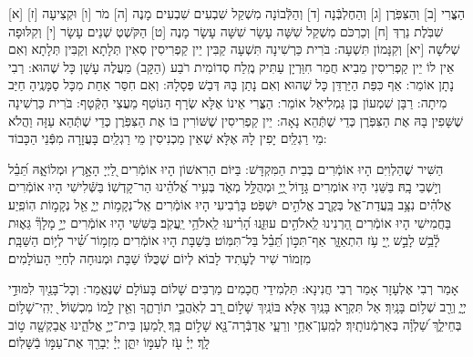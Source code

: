 \documentclass[twoside, openany, parskip=half, 11pt]{book}
\begin{document}
 [א] הַצֳּרִי [ב] וְהַצִּפֹּֽרֶן [ג] וְהַחֶלְבְּֿנָה [ד] וְהַלְּֿבוֹנָה מִשְׁקַל שִׁבְעִים שִׁבְעִים מָנֶה [ה] מֹר [ו] וּקְצִיעָה [ז] שִׁבֹּֽלֶת נֵרְדְּ [ח] וְכַרְכֹּם מִשְׁקַל שִׁשָּׁה עָשָׂר שִׁשָּׁה עָשָׂר מָנֶה [ט] הַקֹּשְׁטְ שְׁנֵים עָשָׂר [י] וְקִלּוּפָה שְׁלֹשָׁה [יא] וְקִנָּמוֹן תִּשְׁעָה: בֹּרִית כַּרְשִׁינָה תִּשְׁעָה קַבִּין יֵין קַפְרִיסִין סְאִין תְּלָתָא וְקַבִּין תְּלָתָא וְאִם אֵין לוֹ יֵין קַפְרִיסִין מֵבִיא חֲמַר חִוַּרְיָן עַתִּיק מֶֽלַח סְדוֹמִית רֹבַע (הַקָּב) מַעֲלֶה עָשָׁן כָּל שֶׁהוּא: רְבִי נָתָן אוֹמֵר: אַף כִּפַּת הַיַּרְדֵּן כָּל שֶׁהוּא וְאִם נָתַן בָּהּ דְּבַשׁ פְּסָלָהּ: וְאִם חִסַּר אַחַת מִכָּל סַמָּנֶֽיהָ חַיַּב מִיתָה: רַבָּן שִׁמְעוֹן בֶּן גַּמְלִיאֵל אוֹמֵר: הַצֳּרִי אֵינוֹ אֶלָּא שְׂרָף הַנּוֹטֵף מֵעֲצֵי הַקְּֿטָף: בֹּרִית כַּרְשִׁינָה שֶׁשָּׁפִין בָּהּ אֶת הַצִּפֹּֽרֶן כְּדֵי שֶׁתְּֿהֵא נָאָה: יֵין קַפְרִיסִין שֶׁשּׁוֹרִין בּוֹ אֶת הַצִּפֹּֽרֶן כְּדֵי שֶׁתְּֿהֵא עַזָּה וַהֲלֹא מֵי רַגְלַֽיִם יָפִין לָהּ אֶלָּא שֶׁאֵין מַכְנִיסִין מֵי רַגְלַֽיִם בָּעֲזָרָה מִפְּֿנֵי הַכָּבוֹד:

\vspace{-.3\baselineskip}
הַשִּׁיר שֶׁהַלְוִיִּם הָיוּ אוֹמְֿרִים בְּבֵית הַמִּקְדָּשׁ: 
 בַּיּוֹם הַרִאשׁוֹן הָיוּ אוֹמְֿרִים לַ֭יְיָ הָאָ֣רֶץ וּמְלוֹאָ֑הּ תֵּ֝בֵ֗ל וְי֣שְׁבֵי בָֽהּ׃
בַּשֵּׁנִי הָיוּ אוֹמְרִים  גָּד֣וֹל ֖יְיָ֣ וּמְהֻלָּ֣ל מְאֹ֑ד בְּעִ֥יר אֱ֝לֹהֵ֗ינוּ הַר־קָדְשֽׁוֹ׃
בַּשְּֿׁלִישִׁי הָיוּ אוֹמְֿרִים  אֱלֹהִ֗ים נִצָּ֥ב בַּֽעֲדַת־אֵ֑ל בְּקֶ֖רֶב אֱלֹהִ֣ים יִשְׁפֹּֽט׃ בָּרְֿבִיעִי הָיוּ אוֹמְֿרִים  אֵֽל־נְקָמ֥וֹת יְיָ֑ אֵ֖ל נְקָמ֣וֹת הֽוֹפִֽיַע׃ בַּחֲמִישִׁי הָיוּ אוֹמְֿרִים  הַ֭רְנִינוּ לֵֽאלֹהִ֣ים עוּזֵּ֑נוּ הָ֝רִ֗יעוּ לֵֽאלֹהֵ֥י יַֽעֲקֹֽב׃ בַּשִּׁשִּׁי הָיוּ אוֹמְֿרִים  יְיָ֣ מָלָךְ֘ גֵּא֢וּת לָ֫בֵ֥שׁ לָבֵ֣שׁ יְ֖יָ עֹ֥ז הִתְאַזָּ֑ר אַף־תִּכּ֣וֹן תֵּ֝בֵ֗ל בַּל־תִּמּֽוֹט׃ בַּשַׁבָּת הָיוּ אוֹמְֿרִים  מִזְמ֥וֹר שִׁ֝֗יר לְי֥וֹם הַשַּׁבָּֽת׃ מִזְמוֹר שִׁיר לֶעָתִיד לָבוֹא לְיוֹם שֶׁכֻּלּוֹ שַׁבָּת וּמְנוּחָה לְחַיֵּי הָעוֹלָמִים׃ 

\vspace{-.3\baselineskip}
 אָמַר רְבִי אֶלְעָזָר אָמַר רְבִי חֲנִינָא: תַּלְמִידֵי חֲכָמִים מַרְבִּים שָׁלוֹם בָּעוֹלָם שֶׁנֶּאֱמַר:  וְכָל־בָּנַ֖יִךְ לִמּוּדֵ֣י יְיָ֑ וְרַ֖ב שְׁל֥וֹם בָּנָֽיִךְ׃ אַל תִּקְרָא בָּנַֽיִךְ אֶלָּא בּוֹנַֽיִךְ  שָׁל֣וֹם רָ֭ב לְאֹֽהֲבֵ֣י תוֹרָתֶ֑ךָ וְאֵ֖ין לָ֣מוֹ מִכְשֽׁוֹל׃   ֖ יְהִֽי־שָׁל֥וֹם בְּחֵילֵ֑ךְ שַׁ֝לְוָ֗ה בְּאַרְמְֿנוֹתָֽיִךְ׃ לְמַֽעַן־אַחַ֥י וְרֵעָ֑י אֲדַבְּֿרָה־נָּ֖א שָׁל֣וֹם בָּֽךְ׃ לְ֭מַעַן בֵּית־יְיָ֣ אֱלֹהֵ֑ינוּ אֲבַקְשָׁ֖ה ט֣וֹב לָֽךְ׃  יְיָ֗ עֹ֖ז לְעַמּ֣וֹ יִתֵּ֑ן יְיָ֓ יְבָרֵ֖ךְ אֶת־עַמּ֣וֹ בַֿשָּׁלֽוֹם׃
 
\end{document}

